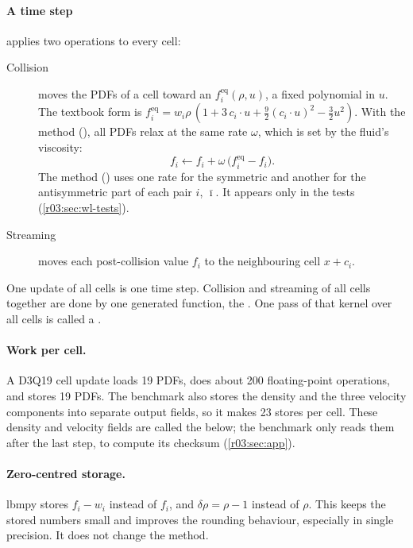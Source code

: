 \paragraph{A time step} applies two operations to every cell:
\begin{description}
  \item[Collision] moves the PDFs of a cell toward an  $f^{\mathrm{eq}}_i(\rho,
        u)$, a fixed polynomial in $u$. The textbook form is $f^{\mathrm{eq}}_i = w_i \rho\,(1 +
        3\,c_i\cdot u + \tfrac92 (c_i\cdot u)^2 - \tfrac32 u^2)$. With the
         method (), all PDFs relax at the same rate
        $\omega$, which is set by the fluid's viscosity:
        \[
          f_i \leftarrow f_i + \omega\,\bigl(f^{\mathrm{eq}}_i - f_i\bigr).
        \]
        The  method () uses one rate for the symmetric and
        another for the antisymmetric part of each pair $i$, $\bar\imath$. It appears only in
        the tests (\cref{r03:sec:wl-tests}).
  \item[Streaming] moves each post-collision value $f_i$ to the neighbouring cell
        $x + c_i$.
\end{description}
One update of all cells is one time step. Collision and streaming of all cells together are
done by one generated function, the . One pass of that kernel
over all cells is called a .

\paragraph{Work per cell.} A D3Q19 cell update loads 19 PDFs, does about 200 floating-point
operations, and stores 19 PDFs. The benchmark also stores the density and the three velocity
components into separate output fields, so it makes 23 stores per cell. These density and
velocity fields are called the  below; the benchmark only reads them after the
last step, to compute its checksum (\cref{r03:sec:app}).

\paragraph{Zero-centred storage.} lbmpy stores $f_i - w_i$ instead of $f_i$, and
$\delta\rho = \rho - 1$ instead of $\rho$. This keeps the stored numbers small and improves
the rounding behaviour, especially in single precision. It does not change the method.

